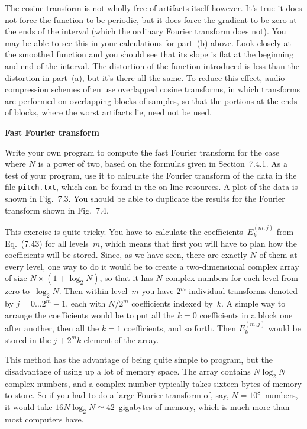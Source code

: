 \documentclass[12pt]{article}
\begin{document}
\begin{exercises}
The cosine transform is not wholly free of artifacts itself however.  It's
true it does not force the function to be periodic, but it does force the
gradient to be zero at the ends of the interval (which the ordinary Fourier
transform does not).  You may be able to see this in your calculations for
part~(b) above.  Look closely at the smoothed function and you should see
that its slope is flat at the beginning and end of the interval.  The
distortion of the function introduced is less than the distortion in
part~(a), but it's there all the same.  To reduce this effect, audio
compression schemes often use overlapped cosine transforms, in which
transforms are performed on overlapping blocks of samples, so that the
portions at the ends of blocks, where the worst artifacts lie, need not be
used.



\exercise \textbf{Fast Fourier transform}

\exskip Write your own program to compute the fast Fourier transform for
the case where $N$ is a power of two, based on the formulas given in
Section~7.4.1.  As a test of your program, use it to calculate the Fourier
transform of the data in the file \verb|pitch.txt|, which can be found in
the on-line resources.  A plot of the data is shown in Fig.~7.3.  You
should be able to duplicate the results for the Fourier transform shown in
Fig.~7.4.

This exercise is quite tricky.  You have to calculate the
coefficients~$E^{(m,j)}_k$ from Eq.~(7.43) for all levels~$m$, which means
that first you will have to plan how the coefficients will be stored.
Since, as we have seen, there are exactly $N$ of them at every level, one
way to do it would be to create a two-dimensional complex array of size
$N\times(1+\log_2 N)$, so that it has $N$ complex numbers for each level
from zero to~$\log_2 N$.  Then within level~$m$ you have $2^m$ individual
transforms denoted by $j=0\ldots 2^m-1$, each with $N/2^m$ coefficients
indexed by~$k$.  A simple way to arrange the coefficients would be to put
all the $k=0$ coefficients in a block one after another, then all the $k=1$
coefficients, and so forth.  Then $E^{(m,j)}_k$ would be stored in the
$j+2^mk$ element of the array.

This method has the advantage of being quite simple to program, but the
disadvantage of using up a lot of memory space.  The array contains
$N\log_2N$ complex numbers, and a complex number typically takes sixteen
bytes of memory to store.  So if you had to do a large Fourier transform
of, say, $N=10^8$~numbers, it would take $16N\log_2N\simeq42$~gigabytes of
memory, which is much more than most computers have.


\end{exercises}
\end{document}
